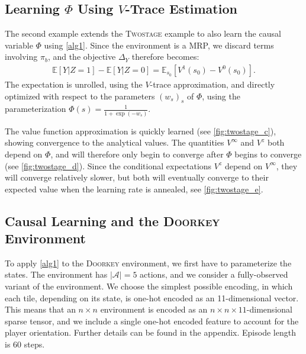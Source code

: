 \documentclass[letterpaper]{article} %
\newcommand{\EE}{\mathbb{E}}
\newcommand{\doorkey}{\textsc{Doorkey}\xspace}
\newcommand{\twostage}{\textsc{Twostage}\xspace}
\begin{document}
	\subsection{Learning $\Phi$ Using $V$-Trace Estimation} \label{sec33} %


	The second example extends the \twostage example to also learn the causal variable $\Phi$ using \cref{alg1}. Since the environment is a MRP, we discard terms involving $\pi_b$, and the objective $\Delta_Y$ therefore becomes: %
	\begin{align}
		\EE\left[Y|Z\!=\!1 \right]\! -\! \EE\left[Y|Z\!=\!0\right]\! =\! \EE_{s_0} \left[ V^{1}(s_0)\! -\! V^{0}(s_0) \right]. \label{eq45}
	\end{align}
	The expectation is unrolled, using the $V$-trace approximation, and directly optimized with respect to the parameters $(w_s)_s$ of $\Phi$, using the parameterization $\Phi(s) = \frac{1}{1+\exp(-w_s)}$.


	The value function approximation is quickly learned (see \cref{fig:twostage_c}), showing convergence to the analytical values.
	The quantities $V^\infty$ and $V^{z}$ both depend on $\Phi$, and will therefore only begin to converge after $\Phi$ begins to converge (see \cref{fig:twostage_d}). Since the conditional expectations $V^z$ depend on $V^\infty$, they will converge relatively slower, but both will eventually converge to their expected value when the learning rate is annealed, see \cref{fig:twostage_e}.








	\subsection{Causal Learning and the \doorkey Environment}
	To apply \cref{alg1} to the \doorkey environment, we first have to parameterize the states. The environment has $|\mathcal A| = 5$ actions, and we consider a fully-observed variant of the environment. We choose the simplest possible encoding, in which each tile, depending on its state, is one-hot encoded as an 11-dimensional vector. This means that an $n\times n$ environment is encoded as an $n\times n \times 11$-dimensional sparse tensor, and we include a single one-hot encoded feature to account for the player orientation. Further details can be found in the appendix. Episode length is 60 steps.
\end{document}
